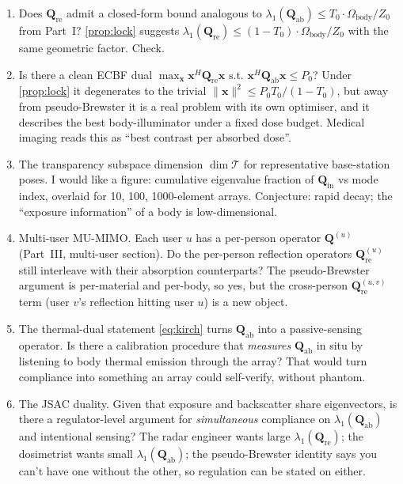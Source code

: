 \documentclass[11pt,a4paper]{article}
\theoremstyle{definition}
\newcommand{\Qabs}{\mathbf{Q}_{\mathrm{ab}}}
\newcommand{\Qref}{\mathbf{Q}_{\mathrm{re}}}
\newcommand{\Qinn}{\mathbf{Q}_{\mathrm{in}}}
\begin{document}
\begin{enumerate}[leftmargin=1.6em,itemsep=3pt]
\item Does $\Qref$ admit a closed-form bound analogous to
$\lambda_1(\Qabs)\le T_0\cdot\Omega_{\mathrm{body}}/Z_0$ from
Part~I?  \cref{prop:lock} suggests
$\lambda_1(\Qref)\le(1-T_0)\cdot\Omega_{\mathrm{body}}/Z_0$
with the same geometric factor.  Check.
\item Is there a clean ECBF dual
$\max_{\mathbf{x}}\mathbf{x}^H\Qref\mathbf{x}
\text{ s.t. }\mathbf{x}^H\Qabs\mathbf{x}\le P_0$?  Under
\cref{prop:lock} it degenerates to the trivial
$\|\mathbf{x}\|^2\le P_0 T_0/(1-T_0)$, but away from pseudo-Brewster
it is a real problem with its own optimiser, and it describes the
best body-illuminator under a fixed dose budget.  Medical imaging
reads this as ``best contrast per absorbed dose''.
\item The transparency subspace dimension $\dim\mathcal{T}$ for
representative base-station poses.  I would like a figure:
cumulative eigenvalue fraction of $\Qinn$ vs mode index, overlaid
for 10, 100, 1000-element arrays.  Conjecture: rapid decay; the
``exposure information'' of a body is low-dimensional.
\item Multi-user MU-MIMO.  Each user $u$ has a per-person operator
$\mathbf{Q}^{(u)}$ (Part~III, multi-user section).  Do the
per-person reflection operators $\mathbf{Q}^{(u)}_{\mathrm{re}}$
still interleave with their absorption counterparts?  The
pseudo-Brewster argument is per-material and per-body, so yes, but
the cross-person $\mathbf{Q}^{(u,v)}_{\mathrm{re}}$ term (user $v$'s
reflection hitting user $u$) is a new object.
\item The thermal-dual statement \cref{eq:kirch} turns $\Qabs$ into
a passive-sensing operator.  Is there a calibration procedure that
\emph{measures} $\Qabs$ in situ by listening to body thermal
emission through the array?  That would turn compliance into
something an array could self-verify, without phantom.
\item The JSAC duality.  Given that exposure and backscatter share
eigenvectors, is there a regulator-level argument for
\emph{simultaneous} compliance on $\lambda_1(\Qabs)$ and
intentional sensing?  The radar engineer wants large
$\lambda_1(\Qref)$; the dosimetrist wants small $\lambda_1(\Qabs)$;
the pseudo-Brewster identity says you can't have one without the
other, so regulation can be stated on either.
\end{enumerate}

\end{document}
